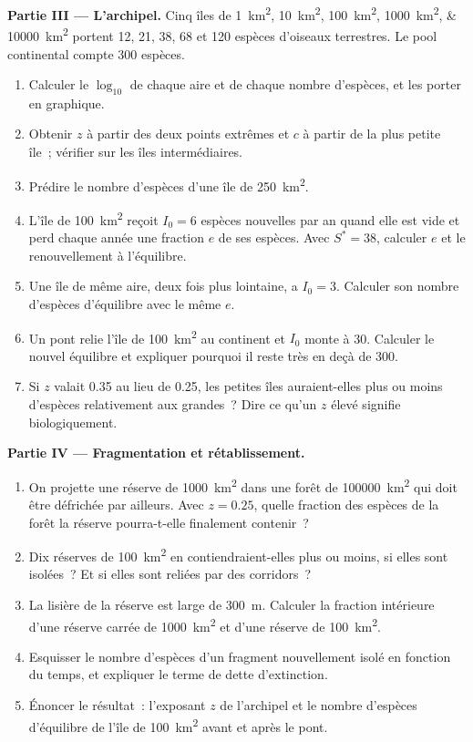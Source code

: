 \begin{problem}
\medskip
\noindent\textbf{Partie III --- L'archipel.}
Cinq îles de \qtylist{1;10;100;1000;10000}{km^2} portent \num{12}, \num{21}, \num{38}, \num{68} et
\num{120} espèces d'oiseaux terrestres. Le pool continental compte
\num{300} espèces.
\begin{enumerate}[resume]
  \item Calculer le $\log_{10}$ de chaque aire et de chaque nombre
        d'espèces, et les porter en graphique.
  \item Obtenir $z$ à partir des deux points extrêmes et $c$ à partir
        de la plus petite île~; vérifier sur les îles intermédiaires.
  \item Prédire le nombre d'espèces d'une île de \qty{250}{km^2}.
  \item L'île de \qty{100}{km^2} reçoit $I_0 = 6$ espèces nouvelles par
        an quand elle est vide et perd chaque année une fraction $e$ de
        ses espèces. Avec $S^* = 38$, calculer $e$ et le renouvellement
        à l'équilibre.
  \item Une île de même aire, deux fois plus lointaine, a $I_0 = 3$.
        Calculer son nombre d'espèces d'équilibre avec le même $e$.
  \item Un pont relie l'île de \qty{100}{km^2} au continent et $I_0$
        monte à \num{30}. Calculer le nouvel équilibre et expliquer
        pourquoi il reste très en deçà de \num{300}.
  \item Si $z$ valait \num{0.35} au lieu de \num{0.25}, les petites
        îles auraient-elles plus ou moins d'espèces relativement aux
        grandes~? Dire ce qu'un $z$ élevé signifie biologiquement.
\end{enumerate}

\medskip
\noindent\textbf{Partie IV --- Fragmentation et rétablissement.}
\begin{enumerate}[resume]
  \item On projette une réserve de \qty{1000}{km^2} dans une forêt de
        \qty{100000}{km^2} qui doit être défrichée par ailleurs. Avec $z =
        0.25$, quelle fraction des espèces de la forêt la réserve
        pourra-t-elle finalement contenir~?
  \item Dix réserves de \qty{100}{km^2} en contiendraient-elles plus ou
        moins, si elles sont isolées~? Et si elles sont reliées par des
        corridors~?
  \item La lisière de la réserve est large de \qty{300}{m}. Calculer la
        fraction intérieure d'une réserve carrée de \qty{1000}{km^2} et
        d'une réserve de \qty{100}{km^2}.
  \item Esquisser le nombre d'espèces d'un fragment nouvellement isolé
        en fonction du temps, et expliquer le terme de dette
        d'extinction.
  \item Énoncer le résultat~: l'exposant $z$ de l'archipel et le nombre
        d'espèces d'équilibre de l'île de \qty{100}{km^2} avant et après
        le pont.
\end{enumerate}
\end{problem}
